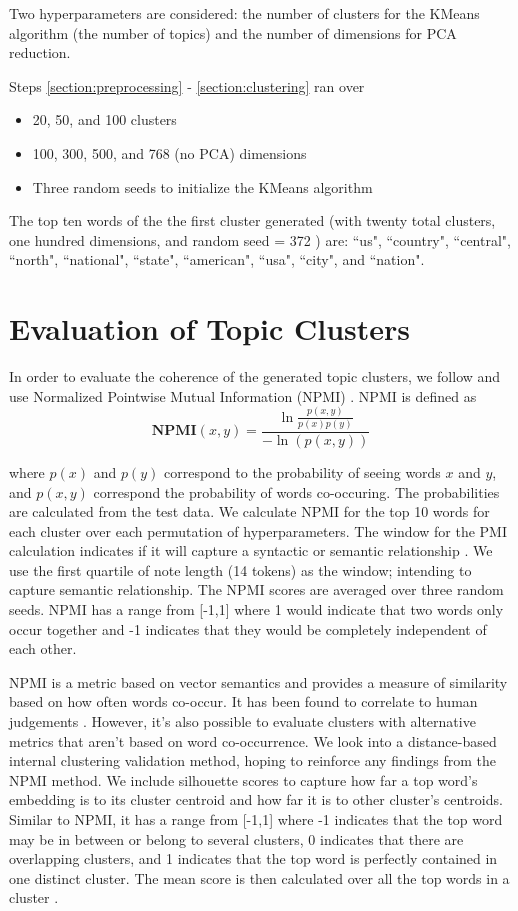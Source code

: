 \documentclass [11pt, proquest] {uwthesis}[2020/02/24]
\begin{document}
Two hyperparameters are considered: the number of clusters for the KMeans algorithm (the number of topics) and the number of dimensions for PCA reduction.

Steps \ref{section:preprocessing} - \ref{section:clustering} ran over
\begin{itemize}
  \item 20, 50, and 100 clusters
  \item 100, 300, 500, and 768 (no PCA) dimensions
  \item Three random seeds to initialize the KMeans algorithm
\end{itemize}

The top ten words of the the first cluster generated (with twenty total clusters, one hundred dimensions, and  random seed = 372 ) are: ``us", ``country", ``central", ``north", ``national", ``state", ``american", ``usa", ``city", and ``nation".

\chapter{Evaluation of Topic Clusters}

In order to evaluate the coherence of the generated topic clusters, we follow \cite{sia-etal-2020-tired} and use Normalized Pointwise Mutual Information (NPMI) \citep{bouma2009normalized}.   NPMI is defined as $$\textbf{NPMI}(x,y) = \frac{\ln\frac{p(x,y)}{p(x)p(y)}}{-\ln(p(x,y))}$$

where $p(x)$ and $p(y)$ correspond to the probability of seeing words $x$ and $y$, and $p(x,y)$ correspond the probability of words co-occuring. The probabilities are calculated from the test data. We calculate NPMI for  the top 10 words for each cluster over each permutation of hyperparameters. The window for the PMI calculation indicates if it will capture a syntactic or semantic relationship \citep{jurafsky_martin_2019}. We use the first quartile of note length (14 tokens) as the window; intending to capture semantic relationship. The NPMI scores are averaged over three random seeds.  NPMI has a range from [-1,1] where 1 would indicate that two words only occur together and -1 indicates that they would be completely independent of each other.

NPMI is a metric based on vector semantics and provides a measure of similarity based on how often words co-occur. It has been found to correlate to human judgements \citep{lau2014machine} . However, it's also possible to evaluate clusters with alternative metrics that aren't based on word co-occurrence. We look into a distance-based internal clustering validation method, hoping to  reinforce any findings from the NPMI method. We include silhouette scores \citep{liu2010understanding}  to capture how far a top word’s embedding is to its cluster centroid and how far it is to other cluster's centroids. Similar to NPMI, it has a range from [-1,1] where -1 indicates that the top word may be in between or belong to several clusters, 0 indicates that there are overlapping clusters, and 1 indicates that the top word is perfectly contained in one distinct cluster. The mean score is then calculated over all the top words in a cluster  \citep{scikit-learn}.
\end{document}

